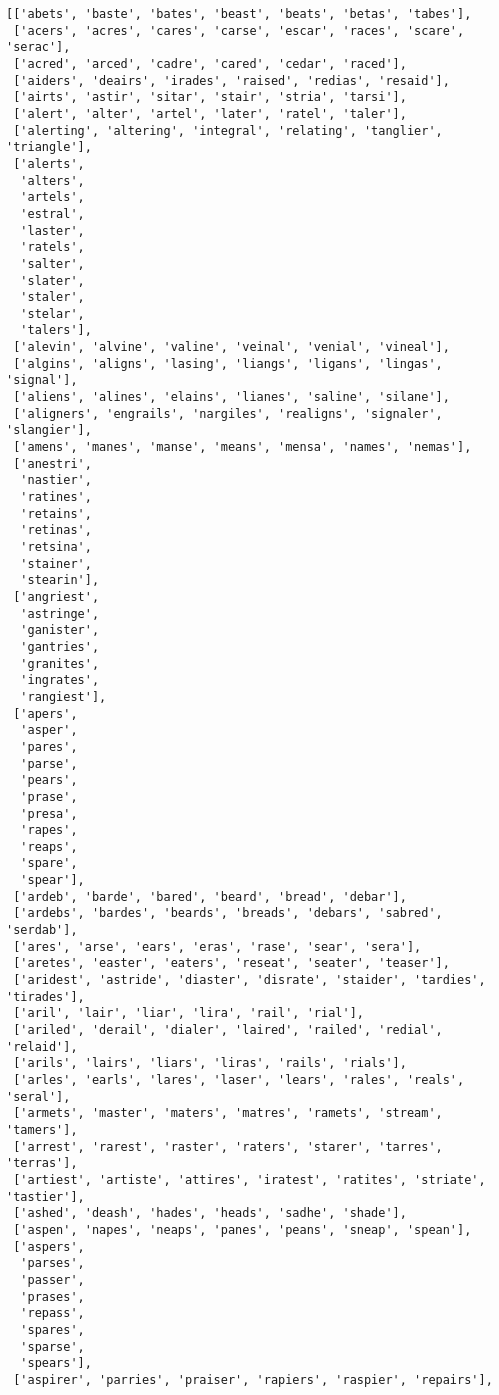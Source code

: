 \documentclass[11pt]{article}
\makeatletter
\newcommand{\boxspacing}{\kern\kvtcb@left@rule\kern\kvtcb@boxsep}
\newcommand{\prompt}[4]{
        {\ttfamily\llap{{\color{#2}[#3]:\hspace{3pt}#4}}\vspace{-\baselineskip}}
    }
\makeatother
\begin{document}
            \begin{tcolorbox}[breakable, size=fbox, boxrule=.5pt, pad at break*=1mm, opacityfill=0]
\prompt{Out}{outcolor}{11}{\boxspacing}
\begin{Verbatim}[commandchars=\\\{\}]
[['abets', 'baste', 'bates', 'beast', 'beats', 'betas', 'tabes'],
 ['acers', 'acres', 'cares', 'carse', 'escar', 'races', 'scare', 'serac'],
 ['acred', 'arced', 'cadre', 'cared', 'cedar', 'raced'],
 ['aiders', 'deairs', 'irades', 'raised', 'redias', 'resaid'],
 ['airts', 'astir', 'sitar', 'stair', 'stria', 'tarsi'],
 ['alert', 'alter', 'artel', 'later', 'ratel', 'taler'],
 ['alerting', 'altering', 'integral', 'relating', 'tanglier', 'triangle'],
 ['alerts',
  'alters',
  'artels',
  'estral',
  'laster',
  'ratels',
  'salter',
  'slater',
  'staler',
  'stelar',
  'talers'],
 ['alevin', 'alvine', 'valine', 'veinal', 'venial', 'vineal'],
 ['algins', 'aligns', 'lasing', 'liangs', 'ligans', 'lingas', 'signal'],
 ['aliens', 'alines', 'elains', 'lianes', 'saline', 'silane'],
 ['aligners', 'engrails', 'nargiles', 'realigns', 'signaler', 'slangier'],
 ['amens', 'manes', 'manse', 'means', 'mensa', 'names', 'nemas'],
 ['anestri',
  'nastier',
  'ratines',
  'retains',
  'retinas',
  'retsina',
  'stainer',
  'stearin'],
 ['angriest',
  'astringe',
  'ganister',
  'gantries',
  'granites',
  'ingrates',
  'rangiest'],
 ['apers',
  'asper',
  'pares',
  'parse',
  'pears',
  'prase',
  'presa',
  'rapes',
  'reaps',
  'spare',
  'spear'],
 ['ardeb', 'barde', 'bared', 'beard', 'bread', 'debar'],
 ['ardebs', 'bardes', 'beards', 'breads', 'debars', 'sabred', 'serdab'],
 ['ares', 'arse', 'ears', 'eras', 'rase', 'sear', 'sera'],
 ['aretes', 'easter', 'eaters', 'reseat', 'seater', 'teaser'],
 ['aridest', 'astride', 'diaster', 'disrate', 'staider', 'tardies', 'tirades'],
 ['aril', 'lair', 'liar', 'lira', 'rail', 'rial'],
 ['ariled', 'derail', 'dialer', 'laired', 'railed', 'redial', 'relaid'],
 ['arils', 'lairs', 'liars', 'liras', 'rails', 'rials'],
 ['arles', 'earls', 'lares', 'laser', 'lears', 'rales', 'reals', 'seral'],
 ['armets', 'master', 'maters', 'matres', 'ramets', 'stream', 'tamers'],
 ['arrest', 'rarest', 'raster', 'raters', 'starer', 'tarres', 'terras'],
 ['artiest', 'artiste', 'attires', 'iratest', 'ratites', 'striate', 'tastier'],
 ['ashed', 'deash', 'hades', 'heads', 'sadhe', 'shade'],
 ['aspen', 'napes', 'neaps', 'panes', 'peans', 'sneap', 'spean'],
 ['aspers',
  'parses',
  'passer',
  'prases',
  'repass',
  'spares',
  'sparse',
  'spears'],
 ['aspirer', 'parries', 'praiser', 'rapiers', 'raspier', 'repairs'],

\end{Verbatim}
\end{tcolorbox}
\end{document}
